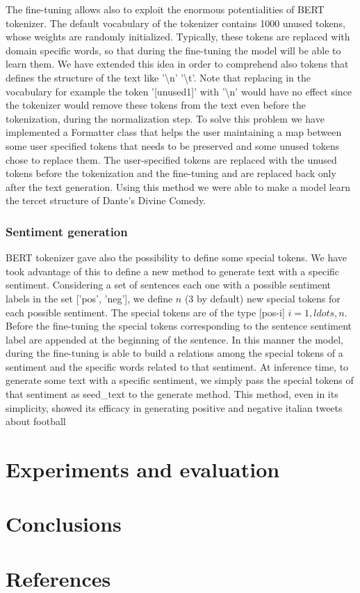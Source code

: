 \documentclass[10pt,twocolumn,letterpaper]{article}
\begin{document}
The fine-tuning allows also to exploit the enormous potentialities of BERT tokenizer.
The default vocabulary of the tokenizer contains 1000 unused tokens,
whose weights are randomly initialized.
Typically, these tokens are replaced with domain specific words,
so that during the fine-tuning the model will be able to learn them.
We have extended this idea in order to comprehend also tokens that defines
the structure of the text like '\textbackslash n' '\textbackslash t'.
Note that replacing in the vocabulary for example the token '[unused1]'
with '\textbackslash n' would have no effect since the tokenizer would
remove these tokens from the text even before the tokenization,
during the normalization step.
To solve this problem we have implemented a Formatter class that helps
the user maintaining a map between some user specified tokens that needs
to be preserved and some unused tokens chose to replace them.
The user-specified tokens are replaced with the unused tokens before
the tokenization and the fine-tuning and are replaced back only after the
text generation.
Using this method we were able to make a model learn the tercet structure
of Dante's Divine Comedy.

\subsubsection{Sentiment generation}
BERT tokenizer gave also the possibility to define some special tokens.
We have took advantage of this to define a new method to generate text
with a specific sentiment.
Considering a set of sentences each one with a possible sentiment labels
in the set ['pos', 'neg'], we define $n$ (3 by default) new special tokens
for each possible sentiment.
The special tokens are of the type [pos-i] $i=1,ldots,n$.
Before the fine-tuning the special tokens corresponding to the sentence
sentiment label are appended at the beginning of the sentence.
In this manner the model, during the fine-tuning is able to build a
relations among the special tokens of a sentiment and the specific words
related to that sentiment.
At inference time, to generate some text with a specific sentiment,
we simply pass the special tokens of that sentiment as seed\_text to the
generate method.
This method, even in its simplicity, showed its efficacy in generating positive
and negative italian tweets about football

\section{Experiments and evaluation}

\section{Conclusions}

\section*{References}
\end{document}
